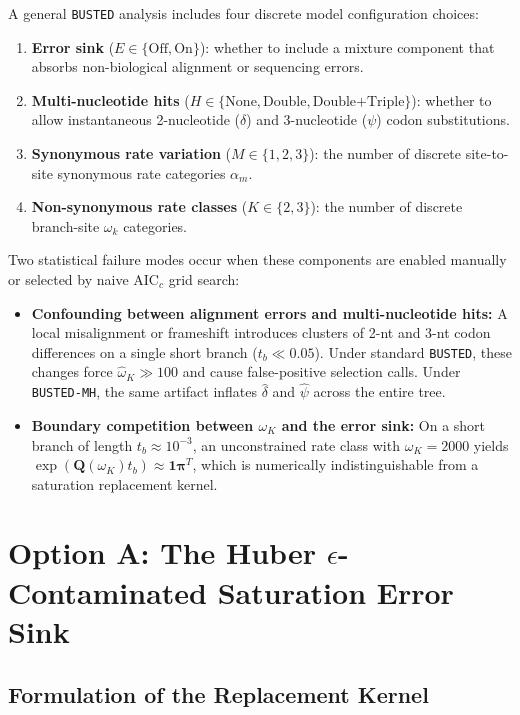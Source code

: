 \documentclass[11pt]{article}
\begin{document}
A general \texttt{BUSTED} analysis includes four discrete model configuration choices:
\begin{enumerate}[nosep]
    \item \textbf{Error sink} ($E \in \{\text{Off}, \text{On}\}$): whether to include a mixture component that absorbs non-biological alignment or sequencing errors.
    \item \textbf{Multi-nucleotide hits} ($H \in \{\text{None}, \text{Double}, \text{Double+Triple}\}$): whether to allow instantaneous 2-nucleotide ($\delta$) and 3-nucleotide ($\psi$) codon substitutions.
    \item \textbf{Synonymous rate variation} ($M \in \{1, 2, 3\}$): the number of discrete site-to-site synonymous rate categories $\alpha_m$.
    \item \textbf{Non-synonymous rate classes} ($K \in \{2, 3\}$): the number of discrete branch-site $\omega_k$ categories.
\end{enumerate}
Two statistical failure modes occur when these components are enabled manually or selected by naive AIC$_c$ grid search:
\begin{itemize}[nosep]
    \item \textbf{Confounding between alignment errors and multi-nucleotide hits:} A local misalignment or frameshift introduces clusters of 2-nt and 3-nt codon differences on a single short branch ($t_b \ll 0.05$). Under standard \texttt{BUSTED}, these changes force $\hat{\omega}_K \gg 100$ and cause false-positive selection calls. Under \texttt{BUSTED-MH}, the same artifact inflates $\hat{\delta}$ and $\hat{\psi}$ across the entire tree.
    \item \textbf{Boundary competition between $\omega_K$ and the error sink:} On a short branch of length $t_b \approx 10^{-3}$, an unconstrained rate class with $\omega_K = 2000$ yields $\exp(\bm{Q}(\omega_K) t_b) \approx \bm{1}\bm{\pi}^T$, which is numerically indistinguishable from a saturation replacement kernel.
\end{itemize}

\section{Option A: The Huber $\epsilon$-Contaminated Saturation Error Sink}

\subsection{Formulation of the Replacement Kernel}
\end{document}
